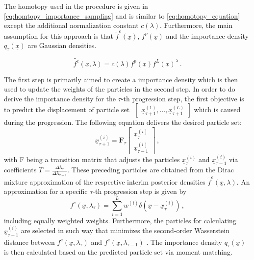 \documentclass[a4paper]{IEEEtran}
\begin{document}
The homotopy used in the procedure \cite{chlebek2016a}is given in \eqref{eq:homtopy_importance_sampling} and is similar to \eqref{eq:homotopy_equation} except the additional normalization constant $c(\lambda)$.
Furthermore, the main assumption for this approach is that $\tilde{f}^{e}(\underline{x})$, $f^{p}(\underline{x})$ and the importance density $q_{\tau}(\underline{x})$ are Gaussian densities.

\begin{equation}
    \tilde{f^e}(\underline{x},\lambda) = c(\lambda)f^p(\underline{x})f^L(\underline{x})^{\lambda} \,.
    \label{eq:homtopy_importance_sampling}
\end{equation}

The first step is primarily aimed to create a importance density which is then used to update the weights of the particles in the second step.
In order to do derive the importance density for the $\tau$-th progression step, the first objective is to predict the displacement of particle set $\,\, \begin{bmatrix} \underline{x}_{\tau+1}^{(1)}, \dotsc, \underline{x}_{\tau+1}^{(L)} \end{bmatrix}$ which is caused during the progression.
The following equation delivers the desired particle set:
\begin{equation}
    \underline{x}_{\tau + 1}^{(i)} = \textbf{F}_{\tau}
        \begin{bmatrix}
            \underline{x}_{\tau}^{(i)} \\ 
            \underline{x}_{\tau -1}^{(i)}
        \end{bmatrix} \,,
\end{equation}
with F being a transition matrix that adjusts the particles $\underline{x}_{\tau}^{(i)}$ and $\underline{x}_{\tau-1}^{(i)}$ via coefficients $T = \frac{\Delta\lambda_{\tau}}{\Delta\lambda_{\tau-1}}$\cite{chlebek2016a}.
These preceding particles are obtained from the Dirac mixture approximation of the respective interim posterior densities $\tilde{f}^{e}(\underline{x}, \lambda)$.
An approximation for a specific $\tau$-th progression step is given by
 \begin{equation}
    f^{e}(\underline{x}, \lambda_{\tau}) = \sum_{i=1}^{L}w^{(i)}\delta(\underline{x}-\underline{x}_{\tau}^{(i)}) \,,
    \label{eq:dirac_approx_interim_posterior}
 \end{equation}
including equally weighted weights.
Furthermore, the particles for calculating $\underline{x}_{\tau + 1}^{(i)}$ are selected in such way that minimizes the second-order Wasserstein distance between  $f^{e}(\underline{x}, \lambda_{\tau})$ and $f^{e}(\underline{x}, \lambda_{\tau-1})$ \cite{chlebek2016a}. 
The importance density $q_{\tau}(\underline{x})$ is then calculated based on the predicted particle set via moment matching.
\end{document}
